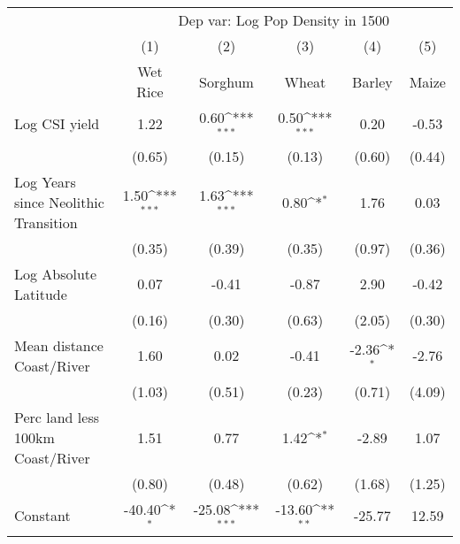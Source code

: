 {
\def\sym#1{\ifmmode^{#1}\else\(^{#1}\)\fi}
\begin{tabular}{l*{5}{c}}
\toprule
                    &\multicolumn{5}{c}{Dep var: Log Pop Density in 1500}                                                         \\
                    &\multicolumn{1}{c}{(1)}         &\multicolumn{1}{c}{(2)}         &\multicolumn{1}{c}{(3)}         &\multicolumn{1}{c}{(4)}         &\multicolumn{1}{c}{(5)}         \\
                    &    Wet Rice         &     Sorghum         &       Wheat         &      Barley         &       Maize         \\
\midrule
Log CSI yield       &        1.22         &        0.60\sym{***}&        0.50\sym{***}&        0.20         &       -0.53         \\
                    &      (0.65)         &      (0.15)         &      (0.13)         &      (0.60)         &      (0.44)         \\
\addlinespace
Log Years since Neolithic Transition&        1.50\sym{***}&        1.63\sym{***}&        0.80\sym{*}  &        1.76         &        0.03         \\
                    &      (0.35)         &      (0.39)         &      (0.35)         &      (0.97)         &      (0.36)         \\
\addlinespace
Log Absolute Latitude&        0.07         &       -0.41         &       -0.87         &        2.90         &       -0.42         \\
                    &      (0.16)         &      (0.30)         &      (0.63)         &      (2.05)         &      (0.30)         \\
\addlinespace
Mean distance Coast/River&        1.60         &        0.02         &       -0.41         &       -2.36\sym{*}  &       -2.76         \\
                    &      (1.03)         &      (0.51)         &      (0.23)         &      (0.71)         &      (4.09)         \\
\addlinespace
Perc land less 100km Coast/River&        1.51         &        0.77         &        1.42\sym{*}  &       -2.89         &        1.07         \\
                    &      (0.80)         &      (0.48)         &      (0.62)         &      (1.68)         &      (1.25)         \\
\addlinespace
Constant            &      -40.40\sym{*}  &      -25.08\sym{***}&      -13.60\sym{**} &      -25.77         &       12.59         \\

\end{tabular}}
